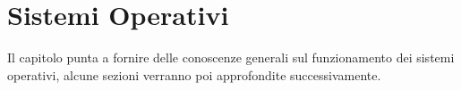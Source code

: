 \chapter{Sistemi Operativi}

Il capitolo punta a fornire delle conoscenze generali sul funzionamento dei sistemi operativi, alcune sezioni verranno poi approfondite successivamente.







